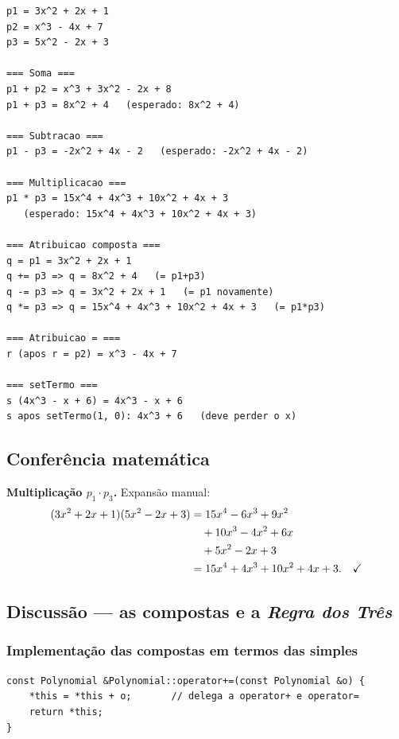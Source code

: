 \documentclass[11pt,a4paper]{article}
\begin{document}
\begin{saidabox}
\begin{lstlisting}[style=terminal]
p1 = 3x^2 + 2x + 1
p2 = x^3 - 4x + 7
p3 = 5x^2 - 2x + 3

=== Soma ===
p1 + p2 = x^3 + 3x^2 - 2x + 8
p1 + p3 = 8x^2 + 4   (esperado: 8x^2 + 4)

=== Subtracao ===
p1 - p3 = -2x^2 + 4x - 2   (esperado: -2x^2 + 4x - 2)

=== Multiplicacao ===
p1 * p3 = 15x^4 + 4x^3 + 10x^2 + 4x + 3
   (esperado: 15x^4 + 4x^3 + 10x^2 + 4x + 3)

=== Atribuicao composta ===
q = p1 = 3x^2 + 2x + 1
q += p3 => q = 8x^2 + 4   (= p1+p3)
q -= p3 => q = 3x^2 + 2x + 1   (= p1 novamente)
q *= p3 => q = 15x^4 + 4x^3 + 10x^2 + 4x + 3   (= p1*p3)

=== Atribuicao = ===
r (apos r = p2) = x^3 - 4x + 7

=== setTermo ===
s (4x^3 - x + 6) = 4x^3 - x + 6
s apos setTermo(1, 0): 4x^3 + 6   (deve perder o x)
\end{lstlisting}
\end{saidabox}

\subsection*{Confer\^encia matem\'atica}

\textbf{Multiplica\c{c}\~ao $p_1 \cdot p_3$.} Expans\~ao manual:
\begin{align*}
(3x^2 + 2x + 1)(5x^2 - 2x + 3) &= 15x^4 - 6x^3 + 9x^2 \\
                                 &\quad + 10x^3 - 4x^2 + 6x \\
                                 &\quad + 5x^2 - 2x + 3 \\
                                 &= 15x^4 + 4x^3 + 10x^2 + 4x + 3. \quad \text{\checkmark}
\end{align*}

\subsection*{Discuss\~ao --- as compostas e a \emph{Regra dos Tr\^es}}

\subsubsection*{Implementa\c{c}\~ao das compostas em termos das simples}

\begin{lstlisting}[style=cppcode,numbers=none]
const Polynomial &Polynomial::operator+=(const Polynomial &o) {
    *this = *this + o;       // delega a operator+ e operator=
    return *this;
}
\end{lstlisting}
\end{document}

